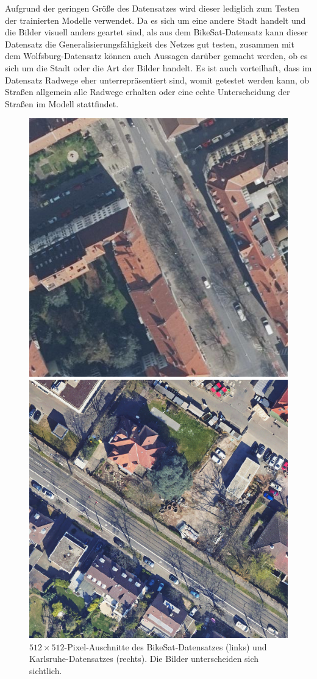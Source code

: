 Aufgrund der geringen Größe des Datensatzes wird dieser lediglich zum Testen der trainierten Modelle verwendet. 
Da es sich um eine andere Stadt handelt und die Bilder visuell anders geartet sind, als aus dem BikeSat-Datensatz 
kann dieser Datensatz die Generalisierungsfähigkeit des Netzes gut testen, zusammen mit dem Wolfsburg-Datensatz 
können auch Aussagen darüber gemacht werden, ob es sich um die Stadt oder die Art der Bilder handelt. 
Es ist auch vorteilhaft, dass im Datensatz Radwege eher unterrepräsentiert sind, womit getestet werden kann, 
ob Straßen allgemein alle Radwege erhalten oder eine echte Unterscheidung der Straßen im Modell stattfindet.

\begin{figure}[h]
	\centering
	\begin{minipage}{.45\textwidth}
		\centering
		\includegraphics[width=.7\linewidth]{Bilder/comp-bikesat.png} 
	\end{minipage}
	\begin{minipage}{.45\textwidth}
		\centering
		\includegraphics[width=.7\linewidth]{Bilder/comp-karlsruhe.png} 
	\end{minipage}

	\caption{$512{\times}512$-Pixel-Auschnitte des BikeSat-Datensatzes (links) 
	und Karlsruhe-Datensatzes (rechts). Die Bilder unterscheiden sich sichtlich.}
	\label{fig:comp-bikesat-karlsruhe}
\end{figure} 

